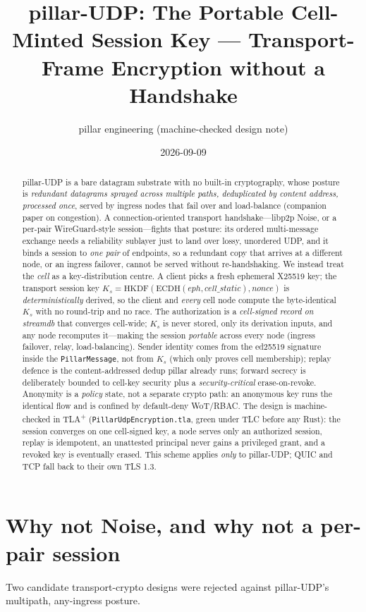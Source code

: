 \documentclass[10pt,twocolumn]{article}
\title{\vspace{-3.5em}\bfseries pillar-UDP: The Portable Cell-Minted Session Key
--- Transport-Frame Encryption without a Handshake}
\author{\normalsize pillar engineering \quad(machine-checked design note)}
\date{\normalsize 2026-09-09}
\newcommand{\code}[1]{\texttt{\small #1}}
\newcommand{\Ks}{\ensuremath{K_s}}
\begin{document}
\maketitle

\begin{abstract}
\noindent
pillar-UDP is a bare datagram substrate with no built-in cryptography, whose
posture is \emph{redundant datagrams sprayed across multiple paths, deduplicated
by content address, processed once}, served by ingress nodes that fail over and
load-balance (companion paper on congestion). A connection-oriented transport
handshake---libp2p Noise, or a per-pair WireGuard-style session---fights that
posture: its ordered multi-message exchange needs a reliability sublayer just to
land over lossy, unordered UDP, and it binds a session to \emph{one pair} of
endpoints, so a redundant copy that arrives at a different node, or an ingress
failover, cannot be served without re-handshaking. We instead treat the
\emph{cell} as a key-distribution centre. A client picks a fresh ephemeral
X25519 key; the transport session key
\Ks{}${}=\mathrm{HKDF}(\mathrm{ECDH}(\mathit{eph},\mathit{cell\_static}),
\mathit{nonce})$ is \emph{deterministically} derived, so the client and
\emph{every} cell node compute the byte-identical \Ks{} with no round-trip and no
race. The authorization is a \emph{cell-signed record on streamdb} that converges
cell-wide; \Ks{} is never stored, only its derivation inputs, and any node
recomputes it---making the session \emph{portable} across every node (ingress
failover, relay, load-balancing). Sender identity comes from the ed25519
signature inside the \code{PillarMessage}, not from \Ks{} (which only proves cell
membership); replay defence is the content-addressed dedup pillar already runs;
forward secrecy is deliberately bounded to cell-key security plus a
\emph{security-critical} erase-on-revoke. Anonymity is a \emph{policy} state, not
a separate crypto path: an anonymous key runs the identical flow and is confined
by default-deny WoT/RBAC. The design is machine-checked in TLA\textsuperscript{+}
(\code{PillarUdpEncryption.tla}, green under TLC before any Rust): the session
converges on one cell-signed key, a node serves only an authorized session,
replay is idempotent, an unattested principal never gains a privileged grant, and
a revoked key is eventually erased. This scheme applies \emph{only} to pillar-UDP;
QUIC and TCP fall back to their own TLS 1.3.
\end{abstract}

\section{Why not Noise, and why not a per-pair session}
Two candidate transport-crypto designs were rejected against pillar-UDP's
multipath, any-ingress posture.
\end{document}
